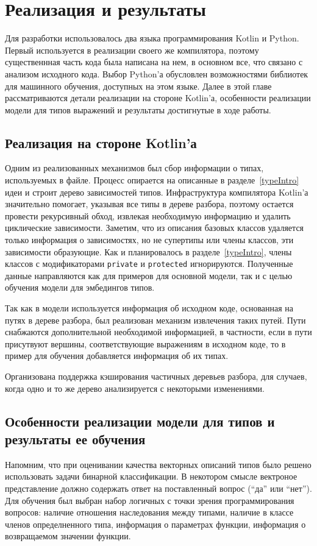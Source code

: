 \documentclass[times,specification,annotation]{itmo-student-thesis}
\begin{document}
\chapter{Реализация и результаты}
Для разработки использовалось два языка программирования Kotlin и Python. Первый используется в реализации своего же компилятора, поэтому существеннная часть кода была написана на нем, в основном все, что связано с анализом исходного кода. Выбор Python'а обусловлен возможностями библиотек для машинного обучения, доступных на этом языке. Далее в этой главе рассматриваются детали реализации на стороне Kotlin'а, особенности реализации модели для типов выражений и результаты достигнутые в ходе работы.

\section{Реализация на стороне Kotlin'а}
Одним из реализованных механизмов был сбор информации о типах, используемых в файле. Процесс опирается на описанные в разделе~\ref{typeIntro} идеи и строит дерево зависимостей типов. Инфраструктура компилятора Kotlin'а значительно помогает, указывая все типы в дереве разбора, поэтому остается провести рекурсивный обход, извлекая необходимую информацию и удалить циклические зависимости. Заметим, что из описания базовых классов удаляется только информация о зависимостях, но не супертипы или члены классов, эти зависимости образующие. Как и планировалось в разделе~\ref{typeIntro}, члены классов с модификаторами \texttt{private} и \texttt{protected} игнорируются. Полученные данные направляются как для примеров для основной модели, так и с целью обучения модели для эмбедингов типов.

Так как в модели используется информация об исходном коде, основанная на путях в дереве разбора, был реализован механизм извлечения таких путей. Пути снабжаются дополнительной необходимой информацией, в частности, если в пути присутвуют вершины, соответствующие выражениям в исходном коде, то в пример для обучения добавляется информация об их типах.

Организована поддержка кэширования частичных деревьев разбора, для случаев, когда одно и то же дерево анализируется с некоторыми изменениями.

\section{Особенности реализации модели для типов и результаты ее обучения}
Напомним, что при оценивании качества векторных описаний типов было решено использовать задачи бинарной классификации. В некотором смысле вектроное представление должно содержать ответ на поставленный вопрос (``да'' или ``нет''). Для обучения был выбран набор логичных с точки зрения программирования вопросов: наличие отношения наследования между типами, наличие в классе членов определненного типа, информация о параметрах функции, информация о возвращаемом значении функции.
\end{document}
